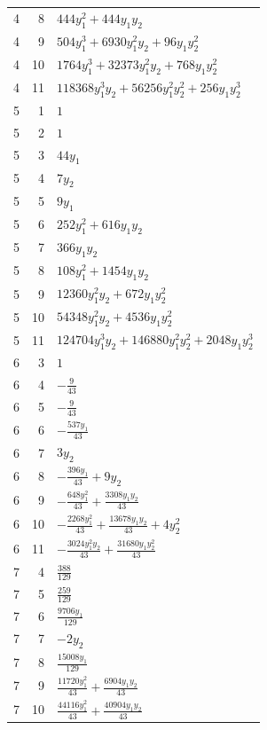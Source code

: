 \documentclass[10pt,a4paper]{article}
\begin{document}
{\begin{longtable}{rrp{125mm}}
4 & 8 & $444 y_{1}^{2} + 444 y_{1} y_{2}$\\
4 & 9 & $504 y_{1}^{3} + 6930 y_{1}^{2} y_{2} + 96 y_{1} y_{2}^{2}$\\
4 & 10 & $1764 y_{1}^{3} + 32373 y_{1}^{2} y_{2} + 768 y_{1} y_{2}^{2}$\\
4 & 11 & $118368 y_{1}^{3} y_{2} + 56256 y_{1}^{2} y_{2}^{2} + 256 y_{1} y_{2}^{3}$\\
5 & 1 & $1$\\
5 & 2 & $1$\\
5 & 3 & $44 y_{1}$\\
5 & 4 & $7 y_{2}$\\
5 & 5 & $9 y_{1}$\\
5 & 6 & $252 y_{1}^{2} + 616 y_{1} y_{2}$\\
5 & 7 & $366 y_{1} y_{2}$\\
5 & 8 & $108 y_{1}^{2} + 1454 y_{1} y_{2}$\\
5 & 9 & $12360 y_{1}^{2} y_{2} + 672 y_{1} y_{2}^{2}$\\
5 & 10 & $54348 y_{1}^{2} y_{2} + 4536 y_{1} y_{2}^{2}$\\
5 & 11 & $124704 y_{1}^{3} y_{2} + 146880 y_{1}^{2} y_{2}^{2} + 2048 y_{1} y_{2}^{3}$\\
6 & 3 & $1$\\
6 & 4 & $- \frac{9}{43}$\\
6 & 5 & $- \frac{9}{43}$\\
6 & 6 & $- \frac{537 y_{1}}{43}$\\
6 & 7 & $3 y_{2}$\\
6 & 8 & $- \frac{396 y_{1}}{43} + 9 y_{2}$\\
6 & 9 & $- \frac{648 y_{1}^{2}}{43} + \frac{3308 y_{1} y_{2}}{43}$\\
6 & 10 & $- \frac{2268 y_{1}^{2}}{43} + \frac{13678 y_{1} y_{2}}{43} + 4 y_{2}^{2}$\\
6 & 11 & $- \frac{3024 y_{1}^{2} y_{2}}{43} + \frac{31680 y_{1} y_{2}^{2}}{43}$\\
7 & 4 & $\frac{388}{129}$\\
7 & 5 & $\frac{259}{129}$\\
7 & 6 & $\frac{9706 y_{1}}{129}$\\
7 & 7 & $- 2 y_{2}$\\
7 & 8 & $\frac{15008 y_{1}}{129}$\\
7 & 9 & $\frac{11720 y_{1}^{2}}{43} + \frac{6904 y_{1} y_{2}}{43}$\\
7 & 10 & $\frac{44116 y_{1}^{2}}{43} + \frac{40904 y_{1} y_{2}}{43}$\\

\end{longtable}}
\end{document}
